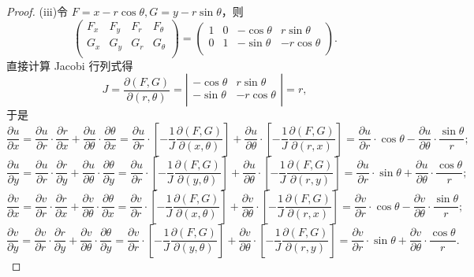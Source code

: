 \documentclass[../../main.tex]{subfiles}
\begin{document}
\begin{proof}
(iii)令 \( F = x - r\cos\theta, G = y - r\sin\theta \)，则
\[
\left( \begin{matrix}
F_x & F_y & F_r & F_{\theta} \\
G_x & G_y & G_r & G_{\theta} \\
\end{matrix} \right) = \left( \begin{matrix}
1 & 0 & -\cos\theta & r\sin\theta \\
0 & 1 & -\sin\theta & -r\cos\theta \\
\end{matrix} \right).
\]
直接计算 Jacobi 行列式得
\[
J = \frac{\partial (F,G)}{\partial (r,\theta)} = \left| \begin{matrix}
-\cos\theta & r\sin\theta \\
-\sin\theta & -r\cos\theta \\
\end{matrix} \right| = r,
\]
于是
\[
\frac{\partial u}{\partial x} = \frac{\partial u}{\partial r} \cdot \frac{\partial r}{\partial x} + \frac{\partial u}{\partial \theta} \cdot \frac{\partial \theta}{\partial x} = \frac{\partial u}{\partial r} \cdot \left[ -\frac{1}{J}\frac{\partial (F,G)}{\partial (x,\theta)} \right] + \frac{\partial u}{\partial \theta} \cdot \left[ -\frac{1}{J}\frac{\partial (F,G)}{\partial (r,x)} \right] = \frac{\partial u}{\partial r} \cdot \cos\theta - \frac{\partial u}{\partial \theta} \cdot \frac{\sin\theta}{r};
\]
\[
\frac{\partial u}{\partial y} = \frac{\partial u}{\partial r} \cdot \frac{\partial r}{\partial y} + \frac{\partial u}{\partial \theta} \cdot \frac{\partial \theta}{\partial y} = \frac{\partial u}{\partial r} \cdot \left[ -\frac{1}{J}\frac{\partial (F,G)}{\partial (y,\theta)} \right] + \frac{\partial u}{\partial \theta} \cdot \left[ -\frac{1}{J}\frac{\partial (F,G)}{\partial (r,y)} \right] = \frac{\partial u}{\partial r} \cdot \sin\theta + \frac{\partial u}{\partial \theta} \cdot \frac{\cos\theta}{r};
\]
\[
\frac{\partial v}{\partial x} = \frac{\partial v}{\partial r} \cdot \frac{\partial r}{\partial x} + \frac{\partial v}{\partial \theta} \cdot \frac{\partial \theta}{\partial x} = \frac{\partial v}{\partial r} \cdot \left[ -\frac{1}{J}\frac{\partial (F,G)}{\partial (x,\theta)} \right] + \frac{\partial v}{\partial \theta} \cdot \left[ -\frac{1}{J}\frac{\partial (F,G)}{\partial (r,x)} \right] = \frac{\partial v}{\partial r} \cdot \cos\theta - \frac{\partial v}{\partial \theta} \cdot \frac{\sin\theta}{r};
\]
\[
\frac{\partial v}{\partial y} = \frac{\partial v}{\partial r} \cdot \frac{\partial r}{\partial y} + \frac{\partial v}{\partial \theta} \cdot \frac{\partial \theta}{\partial y} = \frac{\partial v}{\partial r} \cdot \left[ -\frac{1}{J}\frac{\partial (F,G)}{\partial (y,\theta)} \right] + \frac{\partial v}{\partial \theta} \cdot \left[ -\frac{1}{J}\frac{\partial (F,G)}{\partial (r,y)} \right] = \frac{\partial v}{\partial r} \cdot \sin\theta + \frac{\partial v}{\partial \theta} \cdot \frac{\cos\theta}{r}.
\]
\end{proof}
\end{document}
